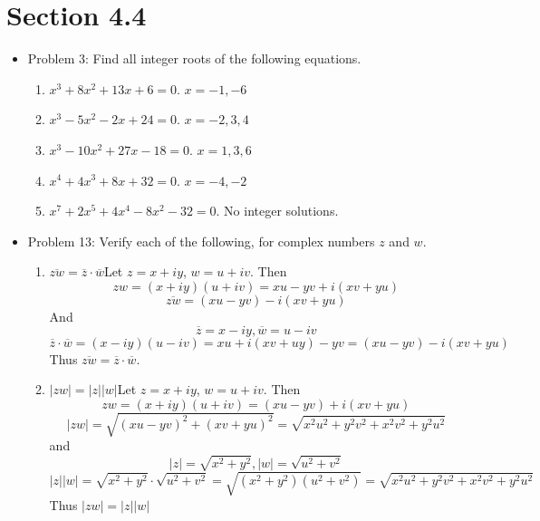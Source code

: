\documentclass[hidelinks,12pt]{article}
\begin{document}
\section{Section 4.4}
\begin{itemize}
    \item Problem 3: Find all integer roots of the following equations.\begin{enumerate}[label=(\alph*)]
        \item $x^3+8x^2+13x+6=0$. $x=-1,-6$
        \item $x^3-5x^2-2x+24=0$. $x=-2,3,4$
        \item $x^3-10x^2+27x-18=0$. $x=1,3,6$
        \item $x^4+4x^3+8x+32=0$. $x=-4,-2$
        \item $x^7+2x^5+4x^4-8x^2-32=0$. No integer solutions.
    \end{enumerate}
    \item Problem 13: Verify each of the following, for complex numbers $z$ and $w$.\begin{enumerate}[label=(\alph*)]
        \item $\overline{zw}=\overline{z}\cdot\overline{w}$\newline Let $z=x+iy$, $w=u+iv$. Then $$zw=(x+iy)(u+iv)=xu-yv+i(xv+yu)$$ $$\overline{zw}=(xu-yv)-i(xv+yu)$$ And $$\overline{z}=x-iy,\overline{w}=u-iv$$ $$\overline{z}\cdot\overline{w}=(x-iy)(u-iv)=xu+i(xv+uy)-yv=(xu-yv)-i(xv+yu)$$ Thus $\overline{zw}=\overline{z}\cdot\overline{w}$.
        \item $|zw|=|z||w|$\newline Let $z=x+iy$, $w=u+iv$. Then $$zw=(x+iy)(u+iv)=(xu-yv)+i(xv+yu)$$ $$|zw|=\sqrt{(xu-yv)^2+(xv+yu)^2}=\sqrt{x^2u^2+y^2v^2+x^2v^2+y^2u^2}$$ and $$|z|=\sqrt{x^2+y^2},|w|=\sqrt{u^2+v^2}$$ $$|z||w|=\sqrt{x^2+y^2}\cdot\sqrt{u^2+v^2}=\sqrt{(x^2+y^2)(u^2+v^2)}=\sqrt{x^2u^2+y^2v^2+x^2v^2+y^2u^2}$$ Thus $|zw|=|z||w|$
    \end{enumerate}
\end{itemize}
\end{document}
